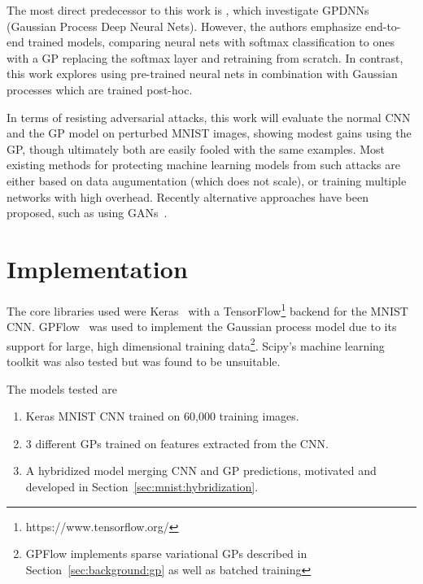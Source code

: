 \documentclass{article}
\begin{document}
The most direct predecessor to this work is \citet{Bradshaw2017}, which investigate GPDNNs (Gaussian Process Deep Neural Nets). However, the authors emphasize end-to-end trained models, comparing neural nets with softmax classification to ones with a GP replacing the softmax layer and retraining from scratch. In contrast, this work explores using pre-trained neural nets in combination with Gaussian processes which are trained post-hoc. 

In terms of resisting adversarial attacks, this work will evaluate the normal CNN and the GP model on perturbed MNIST images, showing modest gains using the GP, though ultimately both are easily fooled with the same examples. Most existing methods for protecting machine learning models from such attacks are either based on data augumentation (which does not scale), or training multiple networks with high overhead. Recently alternative approaches have been proposed, such as using GANs~\cite{samangouei2018defense}\cite{zantedeschi2017efficient}.


 
\section{Implementation}


The core libraries used were Keras~\cite{chollet2015keras} with a TensorFlow\footnote{https://www.tensorflow.org/} backend for the MNIST CNN. GPFlow~\cite{GPflow2017} was used to implement the Gaussian process model due to its support for large, high dimensional training data\footnote{GPFlow implements sparse variational GPs described in Section~\ref{sec:background:gp} as well as batched training}. Scipy's machine learning toolkit was also tested but was found to be unsuitable.

The models tested are
\begin{enumerate}
\item Keras MNIST CNN trained on 60,000 training images.
\item 3 different GPs trained on features extracted from the CNN.
\item A hybridized model merging CNN and GP predictions, motivated and developed in Section~\ref{sec:mnist:hybridization}.
\end{enumerate} 
\end{document}
